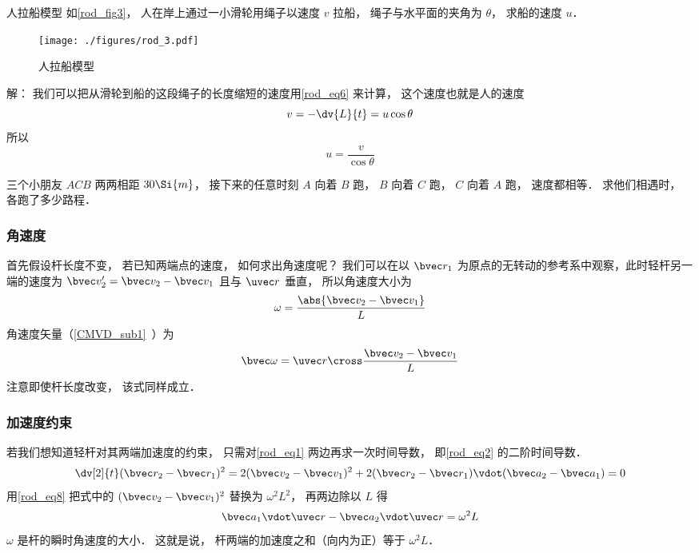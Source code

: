 \begin{example}{人拉船模型}\label{rod_ex2}
如\autoref{rod_fig3}， 人在岸上通过一小滑轮用绳子以速度 $v$ 拉船， 绳子与水平面的夹角为 $\theta$， 求船的速度 $u$．
\begin{figure}[ht]
\centering
\texttt{[image: ./figures/rod\_3.pdf]}
\caption{人拉船模型} \label{rod_fig3}
\end{figure}

解： 我们可以把从滑轮到船的这段绳子的长度缩短的速度用\autoref{rod_eq6} 来计算， 这个速度也就是人的速度
\begin{equation}
v = -\dv{L}{t} = u \cos\theta
\end{equation}
所以
\begin{equation}
u = \frac{v}{\cos\theta}
\end{equation}
\end{example}

\begin{exercise}{}
三个小朋友 $ACB$ 两两相距 $30\Si{m}$， 接下来的任意时刻 $A$ 向着 $B$ 跑， $B$ 向着 $C$ 跑， $C$ 向着 $A$ 跑， 速度都相等． 求他们相遇时， 各跑了多少路程．
\end{exercise}

\subsubsection{角速度}

首先假设杆长度不变， 若已知两端点的速度， 如何求出角速度呢？ 我们可以在以 $\bvec r_1$ 为原点的无转动的参考系中观察，此时轻杆另一端的速度为 $\bvec v_2' = \bvec v_2 - \bvec v_1$ 且与 $\uvec r$ 垂直， 所以角速度大小为
\begin{equation}\label{rod_eq8}
\omega = \frac{\abs{\bvec v_2 - \bvec v_1}}{L}
\end{equation}
角速度矢量（\autoref{CMVD_sub1}~）为
\begin{equation}\label{rod_eq4}
\bvec \omega = \uvec r \cross \frac{\bvec v_2 - \bvec v_1}{L}
\end{equation}
注意即使杆长度改变， 该式同样成立．

\subsubsection{加速度约束}
若我们想知道轻杆对其两端加速度的约束， 只需对\autoref{rod_eq1} 两边再求一次时间导数， 即\autoref{rod_eq2} 的二阶时间导数．
\begin{equation}
\dv[2]{t} (\bvec r_2 - \bvec r_1)^2 = 2(\bvec v_2 - \bvec v_1)^2 + 2(\bvec r_2 - \bvec r_1) \vdot (\bvec a_2 - \bvec a_1) = 0
\end{equation}
用\autoref{rod_eq8} 把式中的 $(\bvec v_2 - \bvec v_1)^2$ 替换为 $\omega^2 L^2$， 再两边除以 $L$ 得
\begin{equation}\label{rod_eq5}
\bvec a_1 \vdot \uvec r - \bvec a_2 \vdot \uvec r  = \omega^2 L
\end{equation}
$\omega$ 是杆的瞬时角速度的大小． 这就是说， 杆两端的加速度之和（向内为正）等于 $\omega^2L$．

